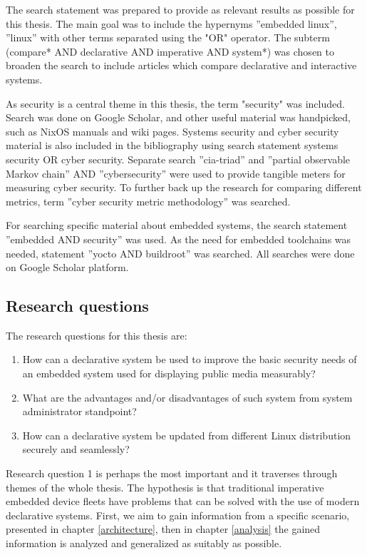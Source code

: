 The search statement was prepared to provide as relevant results as
possible for this thesis. The main goal was to include the hypernyms
''embedded linux'', ''linux'' with other terms separated using the
"OR" operator. The subterm (compare* AND declarative AND imperative
AND system*) was chosen to broaden the search to include articles
which compare declarative and interactive systems.

As security is a central theme in this thesis, the term "security" was
included. Search was done on Google Scholar, and other useful material
was handpicked, such as NixOS manuals and wiki pages. Systems security
and cyber security material is also included in the bibliography using
search statement systems security OR cyber security. Separate search
''cia-triad'' and ''partial observable Markov chain'' AND
''cybersecurity'' were used to provide tangible meters for
measuring cyber security. To further back up the research for
comparing different metrics, term ''cyber security metric
methodology'' was searched.

For searching specific material about embedded systems, the search
statement ''embedded AND security'' was used. As the need for embedded
toolchains was needed, statement ''yocto AND buildroot'' was
searched. All searches were done on Google Scholar platform.

\subsection{Research questions} \label{resquest}

The research questions for this thesis are:

\begin{enumerate}
\item How can a declarative system be used to improve the basic
  security needs of an embedded system used for displaying public
  media measurably?
\item What are the advantages and/or disadvantages of such system from
  system administrator standpoint?
\item How can a declarative system be updated from different Linux
  distribution securely and seamlessly?
\end{enumerate}

Research question 1 is perhaps the most important and it traverses
through themes of the whole thesis. The hypothesis is that traditional
imperative embedded device fleets have problems that can be solved
with the use of modern declarative systems. First, we aim to gain
information from a specific scenario, presented in chapter
\ref{architecture}, then in chapter \ref{analysis} the gained
information is analyzed and generalized as suitably as possible.

